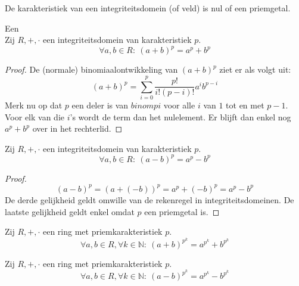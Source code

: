 \documentclass[main.tex]{subfiles}
\begin{document}
\begin{gev}
  \label{gev:karakteristiek-van-domein-is-priem}
  De karakteristiek van een integriteitsdomein (of veld) is nul of een priemgetal.
\end{gev}

\begin{st}
  \label{st:rekenregel-in-integriteitsdomein}
  Een \\
  Zij $R,+,\cdot$ een integriteitsdomein van karakteristiek $p$.
  \[ \forall a,b \in R:\ (a+b)^{p} = a^{p}+b^{p} \]

  \begin{proof}
    De (normale) binomiaalontwikkeling van $(a+b)^{p}$ ziet er als volgt uit:
    \[ (a+b)^{p} = \sum_{i=0}^{p}\frac{p!}{i!(p-i)!} a^{i}b^{p-i} \]
    Merk nu op dat $p$ een deler is van $binom{p}{i}$ voor alle $i$ van $1$ tot en met $p-1$.
    Voor elk van die $i$'s wordt de term dan het nulelement.
    Er blijft dan enkel nog $a^{p} + b^{p}$ over in het rechterlid.
  \end{proof}
\end{st}

\begin{st}
  Zij $R,+,\cdot$ een integriteitsdomein van karakteristiek $p$.
  \[ \forall a,b \in R:\ (a-b)^{p} = a^{p}-b^{p} \]

  \begin{proof}
    \[ (a-b)^{p} = (a+(-b))^{p} = a^{p} + (-b)^{p} = a^{p} - b^{p} \]
    De derde gelijkheid geldt omwille van de rekenregel in integriteitsdomeinen.
    De laatste gelijkheid geldt enkel omdat $p$ een priemgetal is.
  \end{proof}
\end{st}

\begin{st}
  Zij $R,+,\cdot$ een ring met priemkarakteristiek $p$.
  \[ \forall a,b \in R, \forall k \in \mathbb{N}:\ (a+b)^{p^{k}} = a^{p^{k}}+b^{p^{k}} \]
\end{st}

\begin{st}
  Zij $R,+,\cdot$ een ring met priemkarakteristiek $p$.
  \[ \forall a,b \in R, \forall k \in \mathbb{N}:\ (a-b)^{p^{k}} = a^{p^{k}}-b^{p^{k}} \]
\end{st}
\end{document}
